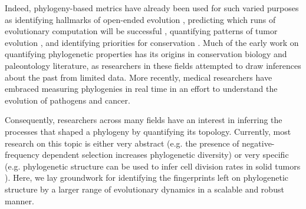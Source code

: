 Indeed, phylogeny-based metrics have already been used for such varied purposes as identifying hallmarks of open-ended evolution \citep{dolsonMODESToolboxMeasurements2019}, predicting which runs of evolutionary computation will be successful \citep{hernandezWhatCanPhylogenetic2022a, shahbandeganUntanglingPhylogeneticDiversity2022a}, quantifying patterns of tumor evolution \citep{scottInferringTumorProliferative2020, lewinsohnStatedependentEvolutionaryModels2023}, and identifying priorities for conservation \citep{forestPreservingEvolutionaryPotential2007}. Much of the early work on quantifying phylogenetic properties has its origins in conservation biology and paleontology literature, as researchers in these fields attempted to draw inferences about the past from limited data. More recently, medical researchers have embraced measuring phylogenies in real time in an effort to understand the evolution of pathogens and cancer.  %

Consequently, researchers across many fields have an interest in inferring the processes that shaped a phylogeny by quantifying its topology. Currently, most research on this topic is either very abstract (e.g. the presence of negative-frequency dependent selection increases phylogenetic diversity) or very specific (e.g. phylogenetic structure can be used to infer cell division rates in solid tumors \citep{lewinsohnStatedependentEvolutionaryModels2023}). Here, we lay groundwork for identifying the fingerprints left on phylogenetic structure by a larger range of evolutionary dynamics in a scalable and robust manner. 


